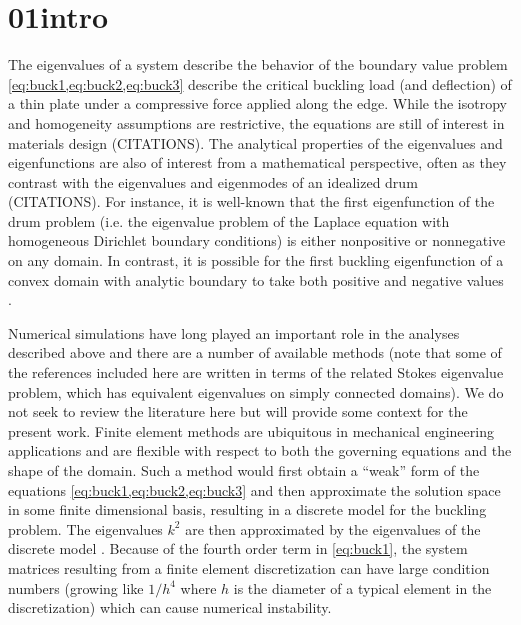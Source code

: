 \section{01intro}

The eigenvalues of a system describe the behavior
of the boundary value problem \cref{eq:buck1,eq:buck2,eq:buck3}
describe the critical buckling load (and deflection)
of a thin plate under
a compressive force applied along the edge. While the
isotropy and homogeneity assumptions are restrictive,
the equations are still of interest in materials design
(CITATIONS). The analytical properties of the eigenvalues and
eigenfunctions are also of interest from a mathematical
perspective, often as they contrast with the eigenvalues
and eigenmodes of an idealized drum (CITATIONS). For instance,
it is well-known that the first eigenfunction of the
drum problem (i.e. the eigenvalue problem of the Laplace
equation with homogeneous Dirichlet boundary conditions)
is either nonpositive or nonnegative on any domain.
In contrast, it is possible for the first buckling
eigenfunction of a convex domain with analytic boundary
to take both positive and negative values \cite{antunes2011buckling}.

Numerical simulations have long played an important
role in the analyses described above and there are a number
of available methods (note that some of the references
included here are written in terms of the related
Stokes eigenvalue problem, which has equivalent
eigenvalues on simply connected domains). We do not
seek to review the literature here but will provide
some context for the present work. Finite element methods
are ubiquitous in mechanical engineering applications
and are flexible with respect to both the governing
equations and the shape of the domain. Such a method
would first obtain a ``weak'' form of the equations
\cref{eq:buck1,eq:buck2,eq:buck3} and then 
approximate the solution space in some
finite dimensional basis, resulting in a discrete model
for the buckling problem.
The eigenvalues $k^2$ are then
approximated by the eigenvalues of the discrete
model \cite{johnson1974beam,rannacher1979nonconforming,
  jia2009approximation,carstensen2014guaranteed}.
Because of the fourth order term in \cref{eq:buck1},
the system matrices resulting from a finite element
discretization can have large condition numbers (growing
like $1/h^4$ where $h$ is the diameter of a typical element
in the discretization) which can cause numerical instability.

